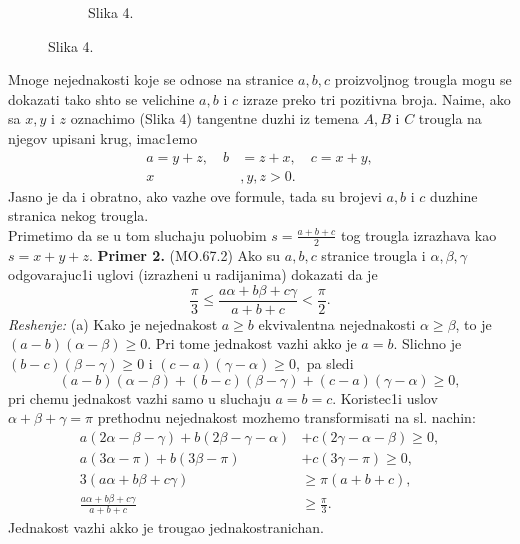 \documentclass[11pt]{article}
\newcommand{\D}{\displaystyle}
\begin{document}
\begin{large}
\begin{flushleft}
\begin{figure}[h!]
\begin{subfigure}{0.35\textwidth}
\caption*{Slika 4.} 
\end{subfigure}
\end{figure}
\end{flushleft}
\end{large}
\vspace{0.2cm}
\large
Mnoge nejednakosti koje se odnose na stranice $a, b, c$ proizvoljnog trougla mogu se dokazati tako shto se velichine $a,b$ i $c$ izraze preko tri pozitivna broja. Naime, ako sa $x, y$ i $z$ oznachimo
(Slika 4) tangentne duzhi iz temena $A, B$ i $C$ trougla na njegov upisani krug, imac1emo
\begin{equation}
\begin{aligned}
a=y+z,\quad b&=z+x, \quad c=x+y, \\
x&,y,z>0.   
\end{aligned}
\end{equation} 
Jasno je da i obratno, ako vazhe ove formule, tada su brojevi $a,b$ i $c$ duzhine stranica nekog trougla.\\Primetimo da se u tom sluchaju poluobim $\D s=\frac{a+b+c}{2}$ tog trougla izrazhava kao\\ $s=x+y+z.$
\newpage
\textbf{Primer 2.} (MO.67.2) Ako su $a,b,c$ stranice trougla i $\alpha,\beta,\gamma$ odgovarajuc1i uglovi (izrazheni u radijanima) dokazati da je $$\D\frac{\pi}{3}\leq\frac{a\alpha+b\beta+c\gamma}{a+b+c}<\frac{\pi}{2}.$$
\textit{Reshenje:} (a) Kako je nejednakost $a\geq b$ ekvivalentna nejednakosti $\alpha\geq\beta$, to je \\$(a-b)(\alpha-\beta)\geq0$. Pri tome jednakost vazhi akko je $a=b.$ Slichno je $(b-c)(\beta-\gamma)\geq0$ i $(c-a)(\gamma-\alpha)\geq0,$ pa sledi $$(a-b)(\alpha-\beta)+(b-c)(\beta-\gamma)+(c-a)(\gamma-\alpha)\geq0,$$ pri chemu jednakost vazhi samo u sluchaju $a=b=c.$ 
Koristec1i uslov $\alpha+\beta+\gamma=\pi$ prethodnu nejednakost mozhemo transformisati na sl. nachin:
\begin{equation*}
\begin{aligned}
a(2\alpha-\beta-\gamma)+b(2\beta-\gamma-\alpha)&+c(2\gamma-\alpha-\beta)\geq0,\\
a(3\alpha-\pi)+b(3\beta-\pi)&+c(3\gamma-\pi)\geq0,\\
3(a\alpha+b\beta+c\gamma)&\geq\pi(a+b+c),\\
\D\frac{a\alpha+b\beta+c\gamma}{a+b+c}&\geq\frac{\pi}{3}.
\end{aligned}
\end{equation*}
Jednakost vazhi akko je trougao jednakostranichan.
\end{document}
